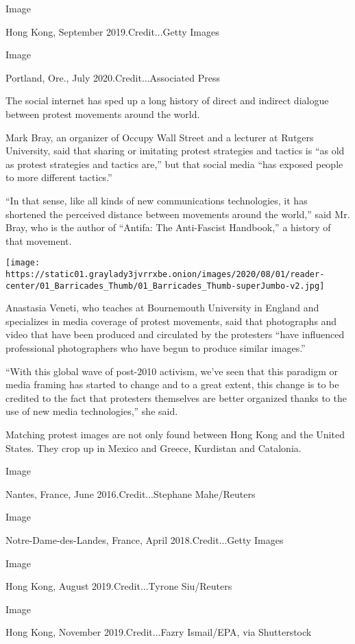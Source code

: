 Image

Hong Kong, September 2019.Credit...Getty Images

Image

Portland, Ore., July 2020.Credit...Associated Press

The social internet has sped up a long history of direct and indirect
dialogue between protest movements around the world.

Mark Bray, an organizer of Occupy Wall Street and a lecturer at Rutgers
University, said that sharing or imitating protest strategies and
tactics is ``as old as protest strategies and tactics are,'' but that
social media ``has exposed people to more different tactics.''

``In that sense, like all kinds of new communications technologies, it
has shortened the perceived distance between movements around the
world,'' said Mr. Bray, who is the author of ``Antifa: The Anti-Fascist
Handbook,'' a history of that movement.

\texttt{[image: https://static01.graylady3jvrrxbe.onion/images/2020/08/01/reader-center/01\_Barricades\_Thumb/01\_Barricades\_Thumb-superJumbo-v2.jpg]}

Anastasia Veneti, who teaches at Bournemouth University in England and
specializes in media coverage of protest movements, said that
photographs and video that have been produced and circulated by the
protesters ``have influenced professional photographers who have begun
to produce similar images.''

``With this global wave of post-2010 activism, we've seen that this
paradigm or media framing has started to change and to a great extent,
this change is to be credited to the fact that protesters themselves are
better organized thanks to the use of new media technologies,'' she
said.

Matching protest images are not only found between Hong Kong and the
United States. They crop up in Mexico and Greece, Kurdistan and
Catalonia.

Image

Nantes, France, June 2016.Credit...Stephane Mahe/Reuters

Image

Notre-Dame-des-Landes, France, April 2018.Credit...Getty Images

Image

Hong Kong, August 2019.Credit...Tyrone Siu/Reuters

Image

Hong Kong, November 2019.Credit...Fazry Ismail/EPA, via Shutterstock

